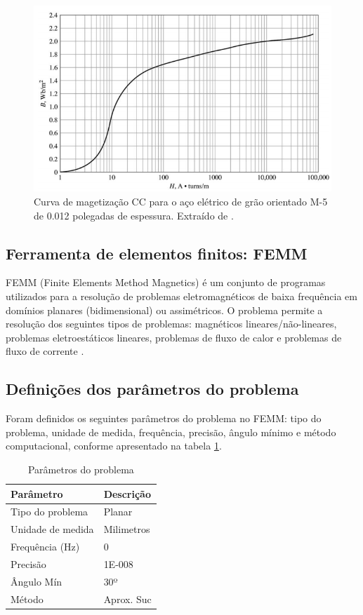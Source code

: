 \begin{figure}[H]
\centering
\includegraphics[scale=0.5]{img/assig1/curv_magn.png}
\caption[Curva de magetização CC para o aço elétrico de grão orientado M-5 de 0.012 polegadas de espessura]{Curva de magetização CC para o aço elétrico de grão orientado M-5 de 0.012 polegadas de espessura. Extraído de \cite{Fitzgerald2008}.}
\label{cc}
\end{figure}

\subsection{Ferramenta de elementos finitos: FEMM}
FEMM (Finite Elements Method Magnetics) é um conjunto de programas utilizados para a resolução de problemas eletromagnéticos de baixa frequência em domínios planares (bidimensional) ou assimétricos. O problema permite a resolução dos seguintes tipos de problemas: magnéticos lineares/não-lineares, problemas eletroestáticos lineares, problemas de fluxo de calor e problemas de fluxo de corrente \cite{Meeker2014}.

\subsection{Definições dos parâmetros do problema}
Foram definidos os seguintes parâmetros do problema no FEMM: tipo do problema, unidade de medida, frequência, precisão, ângulo mínimo e método computacional, conforme apresentado na tabela \ref{probdef}.
\begin{table}[H]
\centering
\caption{Parâmetros do problema}
\label{probdef}
\begin{tabular}{ll}
\hline
\textbf{Parâmetro} & \textbf{Descrição} \\ \hline
Tipo do problema   & Planar             \\
Unidade de medida  & Milimetros         \\
Frequência (Hz)    & 0                  \\
Precisão           & 1E-008             \\
Ângulo Mín         & 30º                \\
Método             & Aprox. Suc         \\ \hline
\end{tabular}
\end{table}

